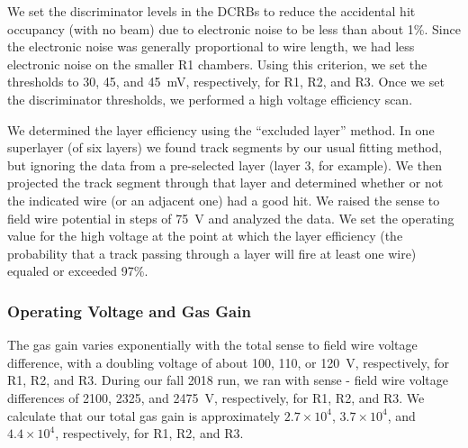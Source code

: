 We set the discriminator levels in the DCRBs to reduce the accidental hit occupancy (with no beam) due to
electronic noise to be less than about 1\%.  Since the electronic noise was generally proportional to wire length,
we had less electronic noise on the smaller R1 chambers.  Using this criterion, we set the thresholds to 30, 45,
and 45~mV, respectively, for R1, R2, and R3.  
Once we set the discriminator thresholds, we performed a high voltage efficiency scan.  

We determined the layer efficiency using the ``excluded layer'' method.  In one superlayer (of six layers) we
found track segments by our usual fitting method, but ignoring the data from a pre-selected layer (layer 3, for
example).  We then projected the track segment through that layer and determined whether or not the indicated
wire (or an adjacent one) had a good hit.
We raised the sense to field wire potential in
steps of 75~V and analyzed the data.  We set the operating value for the high voltage at the point at which
the layer efficiency (the probability that a track passing through a layer will fire at least one wire) equaled or
exceeded 97\%.



\subsubsection{Operating Voltage and Gas Gain}
\label{operating-voltage}

The gas gain varies exponentially with the total sense to field wire voltage
difference, with a doubling voltage of about 100, 110, or 120~V, respectively, for
R1, R2, and R3.  During our fall 2018 run, we ran with sense - field wire voltage
differences of 2100, 2325, and 2475~V, respectively, for R1, R2, and R3.
We calculate that our total gas gain is approximately 
$2.7 \times 10^4$, $3.7 \times 10^4$, and $4.4 \times 10^4$,  
respectively, for R1, R2, and R3.

